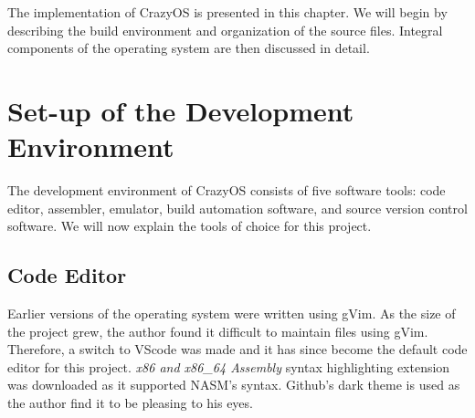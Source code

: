 \begin{enumerate}
\end{enumerate}
The implementation of CrazyOS is presented in this chapter. We will begin by describing the build environment and organization of the source files. Integral components of the operating system are then discussed in detail.

\section{Set-up of the Development Environment}
The development environment of CrazyOS consists of five software tools: code editor, assembler, emulator, build automation software, and source version control software. We will now explain the tools of choice for this project.

\subsection{Code Editor}
Earlier versions of the operating system were written using gVim. As the size of the project grew, the author found it difficult to maintain files using gVim. Therefore, a switch to VScode was made and it has since become the default code editor for this project. \textit{x86 and x86\_64 Assembly} syntax highlighting extension was downloaded as it supported NASM's syntax. Github's dark theme is used as the author find it to be pleasing to his eyes.

